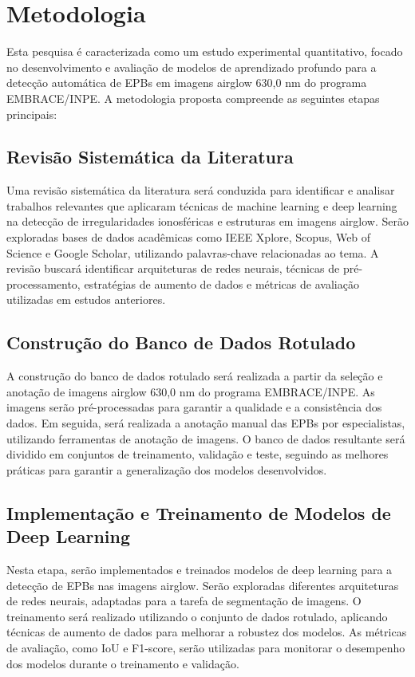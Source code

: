 \chapter{Metodologia}

Esta pesquisa é caracterizada como um estudo experimental quantitativo, focado no desenvolvimento e avaliação de modelos de aprendizado profundo para a detecção automática de EPBs em imagens airglow 630,0 nm do programa EMBRACE/INPE. A metodologia proposta compreende as seguintes etapas principais:

\section{Revisão Sistemática da Literatura}

Uma revisão sistemática da literatura será conduzida para identificar e analisar trabalhos relevantes que aplicaram técnicas de machine learning e deep learning na detecção de irregularidades ionosféricas e estruturas em imagens airglow. Serão exploradas bases de dados acadêmicas como IEEE Xplore, Scopus, Web of Science e Google Scholar, utilizando palavras-chave relacionadas ao tema. A revisão buscará identificar arquiteturas de redes neurais, técnicas de pré-processamento, estratégias de aumento de dados e métricas de avaliação utilizadas em estudos anteriores.

\section{Construção do Banco de Dados Rotulado}

A construção do banco de dados rotulado será realizada a partir da seleção e anotação de imagens airglow 630,0 nm do programa EMBRACE/INPE. As imagens serão pré-processadas para garantir a qualidade e a consistência dos dados. Em seguida, será realizada a anotação manual das EPBs por especialistas, utilizando ferramentas de anotação de imagens. O banco de dados resultante será dividido em conjuntos de treinamento, validação e teste, seguindo as melhores práticas para garantir a generalização dos modelos desenvolvidos.

\section{Implementação e Treinamento de Modelos de Deep Learning}

Nesta etapa, serão implementados e treinados modelos de deep learning para a detecção de EPBs nas imagens airglow. Serão exploradas diferentes arquiteturas de redes neurais, adaptadas para a tarefa de segmentação de imagens. O treinamento será realizado utilizando o conjunto de dados rotulado, aplicando técnicas de aumento de dados para melhorar a robustez dos modelos. As métricas de avaliação, como IoU e F1-score, serão utilizadas para monitorar o desempenho dos modelos durante o treinamento e validação.